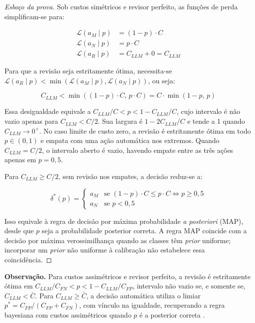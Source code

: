\begin{proof}[Esboço da prova]
Sob custos simétricos e revisor perfeito, as funções de perda simplificam-se para:

\[
\begin{aligned}
\mathcal{L}(a_M \mid p) &= (1-p) \cdot C \\
\mathcal{L}(a_N \mid p) &= p \cdot C \\
\mathcal{L}(a_R \mid p) &= C_{LLM} + 0 = C_{LLM}
\end{aligned}
\]

Para que a revisão seja estritamente ótima, necessita-se $\mathcal{L}(a_R\mid p) < \min(\mathcal{L}(a_M\mid p), \mathcal{L}(a_N\mid p))$, ou seja:

\[
C_{LLM} < \min((1-p) \cdot C,\, p \cdot C) = C \cdot \min(1-p,\, p)
\]

Essa desigualdade equivale a $C_{LLM}/C<p<1-C_{LLM}/C$, cujo intervalo é não vazio apenas para $C_{LLM}<C/2$. Sua largura é $1-2C_{LLM}/C$ e tende a 1 quando $C_{LLM}\to0^+$. No caso limite de custo zero, a revisão é estritamente ótima em todo $p\in(0,1)$ e empata com uma ação automática nos extremos. Quando $C_{LLM}=C/2$, o intervalo aberto é vazio, havendo empate entre as três ações apenas em $p=0{,}5$.

Para $C_{LLM}\ge C/2$, sem revisão nos empates, a decisão reduz-se a:

\[
\delta^*(p) =
\begin{cases}
a_M & \text{se } (1-p) \cdot C \le p \cdot C \iff p \ge 0{,}5 \\
a_N & \text{se } p < 0{,}5
\end{cases}
\]

Isso equivale à regra de decisão por máxima probabilidade \textit{a posteriori} (MAP), desde que $p$ seja a probabilidade posterior correta. A regra MAP coincide com a decisão por máxima verossimilhança quando as classes têm \textit{prior} uniforme; incorporar um \textit{prior} não uniforme à calibração não estabelece essa coincidência.
\end{proof}

\textbf{Observação.} Para custos assimétricos e revisor perfeito, a revisão é estritamente ótima em $C_{LLM}/C_{FN}<p<1-C_{LLM}/C_{FP}$, intervalo não vazio se, e somente se, $C_{LLM}<\bar C$. Para $C_{LLM}\ge\bar C$, a decisão automática utiliza o limiar $p^*=C_{FP}/(C_{FP}+C_{FN})$, com vínculo na igualdade, recuperando a regra bayesiana com custos assimétricos quando $p$ é a posterior correta \cite{Sadinle2017}.

